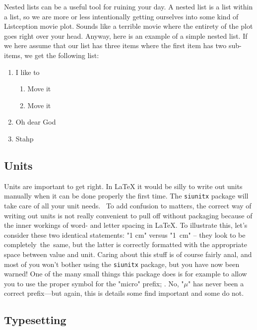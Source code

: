 Nested lists can be a useful tool for ruining your day. A nested list is a list within a list, so we are more or less intentionally getting ourselves into some kind of Listception movie plot. Sounds like a terrible movie where the entirety of the plot goes right over your head. Anyway, here is an example of a simple nested list. If we here assume that our list has three items where the first item has two sub-items, we get the following list:

\begin{enumerate}
	\item I like to
		\begin{enumerate}
			\item Move it
			\item Move it
		\end{enumerate}
	\item Oh dear God
	\item Stahp
\end{enumerate}

\subsection{Units}\label{sec.units}

Units are important to get right. In \LaTeX{} it would be silly to write out units manually when it can be done properly the first time. The \verb|siunitx| package will take care of all your unit needs.~\cite{package.siunitx} To add confusion to matters, the correct way of writing out units is not really convenient to pull off without packaging because of the inner workings of word- and letter spacing in \LaTeX{}. To illustrate this, let's consider these two identical statements: "1 cm" versus "\SI{1}{\centi \metre}" -- they look to be completely~the~same, but the latter is correctly formatted with the appropriate space between value and unit. Caring about this stuff is of course fairly anal, and most of you won't bother using the \verb|siunitx| package, but you have now been warned! One of the many small things this package does is for example to allow you to use the proper symbol for the "micro" prefix; \si{\micro}. No, "$\mu$" has never been a correct prefix---but again, this is details some find important and some do not.

\subsection{Typesetting}\label{sec.typesetting}

